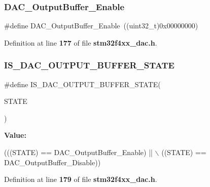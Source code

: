 \subsubsection{D\+A\+C\+\_\+\+Output\+Buffer\+\_\+\+Enable}
{\footnotesize\ttfamily \#define D\+A\+C\+\_\+\+Output\+Buffer\+\_\+\+Enable~((uint32\+\_\+t)0x00000000)}



Definition at line \textbf{ 177} of file \textbf{ stm32f4xx\+\_\+dac.\+h}.

\mbox{\label{group__DAC__output__buffer_gaa5a56816d641129fb62d11133c9dcccd}} 
\subsubsection{I\+S\+\_\+\+D\+A\+C\+\_\+\+O\+U\+T\+P\+U\+T\+\_\+\+B\+U\+F\+F\+E\+R\+\_\+\+S\+T\+A\+TE}
{\footnotesize\ttfamily \#define I\+S\+\_\+\+D\+A\+C\+\_\+\+O\+U\+T\+P\+U\+T\+\_\+\+B\+U\+F\+F\+E\+R\+\_\+\+S\+T\+A\+TE(\begin{DoxyParamCaption}\item[{}]{S\+T\+A\+TE }\end{DoxyParamCaption})}

{\bfseries Value\+:}
\begin{DoxyCode}
(((STATE) == DAC_OutputBuffer_Enable) || \(\backslash\)
                                           ((STATE) == DAC_OutputBuffer_Disable))
\end{DoxyCode}


Definition at line \textbf{ 179} of file \textbf{ stm32f4xx\+\_\+dac.\+h}.

